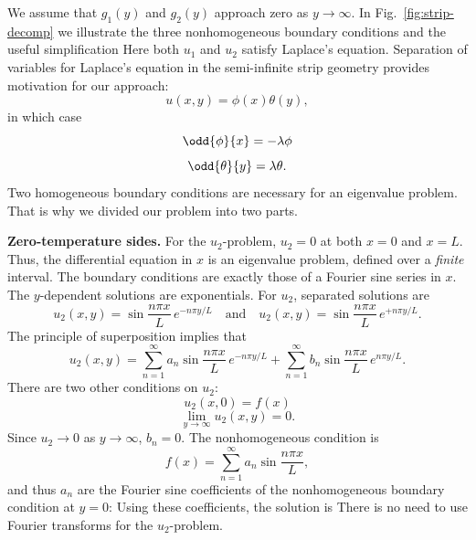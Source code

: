 We assume that $g_1(y)$ and $g_2(y)$ approach zero as $y \to \infty$.  In Fig.~\ref{fig:strip-decomp} we illustrate the three nonhomogeneous boundary conditions and the useful simplification
Here both $u_1$ and $u_2$ satisfy Laplace's equation.  Separation of variables for Laplace's equation in the semi-infinite strip geometry provides motivation for our approach:
\begin{equation}
\label{eq:strip-sep}
u(x,y) = \phi(x)\theta(y),
\end{equation}
in which case
\begin{equation}
\label{eq:strip-ode-x}
\odd{\phi}{x} = -\lambda\phi
\end{equation}
\begin{equation}
\label{eq:strip-ode-y}
\odd{\theta}{y} = \lambda\theta.
\end{equation}
Two homogeneous boundary conditions are necessary for an eigenvalue problem.  That is why we divided our problem into two parts.

\textbf{Zero-temperature sides.}  For the $u_2$-problem, $u_2 = 0$ at both $x = 0$ and $x = L$.  Thus, the differential equation in $x$ is an eigenvalue problem, defined over a \textit{finite} interval.  The boundary conditions are exactly those of a Fourier sine series in $x$.  The $y$-dependent solutions are exponentials.  For $u_2$, separated solutions are
\[
u_2(x,y) = \sin\frac{n\pi x}{L}\,e^{-n\pi y/L} \quad \text{and} \quad u_2(x,y) = \sin\frac{n\pi x}{L}\,e^{+n\pi y/L}.
\]
The principle of superposition implies that
\begin{equation}
\label{eq:strip-u2-super}
u_2(x,y) = \sum_{n=1}^{\infty}a_n\sin\frac{n\pi x}{L}\,e^{-n\pi y/L} + \sum_{n=1}^{\infty}b_n\sin\frac{n\pi x}{L}\,e^{n\pi y/L}.
\end{equation}
There are two other conditions on $u_2$:
\begin{equation}
\label{eq:strip-u2-ic}
u_2(x,0) = f(x)
\end{equation}
\begin{equation}
\label{eq:strip-u2-decay}
\lim_{y\to\infty}u_2(x,y) = 0.
\end{equation}
Since $u_2 \to 0$ as $y \to \infty$, $b_n = 0$.  The nonhomogeneous condition is
\begin{equation}
\label{eq:strip-u2-fourier}
f(x) = \sum_{n=1}^{\infty}a_n\sin\frac{n\pi x}{L},
\end{equation}
and thus $a_n$ are the Fourier sine coefficients of the nonhomogeneous boundary condition at $y = 0$:
Using these coefficients, the solution is
There is no need to use Fourier transforms for the $u_2$-problem.

